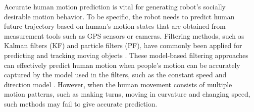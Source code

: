 \documentclass[journal]{IEEEtran}
\newcommand{\todonote}[1]{\vspace{0px} %
	\todo[inline, color=green!30]{\textbf{[Note:]} {#1}} %
}
\newcommand{\todohere}[1]{\hl{(\textbf{TODO:} #1)}}
\begin{document}
Accurate human motion prediction is vital for generating robot's socially desirable motion behavior.
	To be specific, the robot needs to predict human future trajectory based on human's motion states that are obtained from measurement tools such as GPS sensors or cameras.
	Filtering methods, such as Kalman filters (KF) and particle filters (PF), have commonly been applied for predicting and tracking moving objects \cite {koller1994robust,rui2001better,yi2015single}.
    These model-based filtering approaches can effectively predict human motion when people's motion can be accurately captured by the model used in the filters, such as the constant speed and direction model \cite{svenstrup2010trajectory,cosgun2013autonomous}.
	 However, when the human movement consists of multiple motion patterns, such as making turns, moving in curvature and changing speed, such methods may fail to give accurate prediction.
	
	
\end{document}
